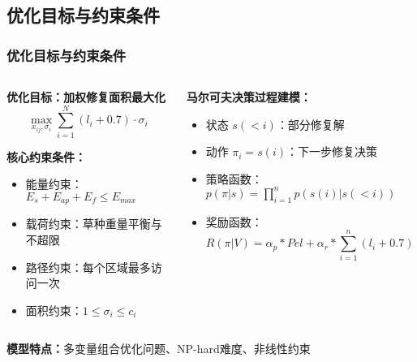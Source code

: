 \documentclass[10pt, aspectratio=169]{beamer}  %
\begin{document}
\subsection{优化目标与约束条件}
\begin{frame}
	\frametitle{优化目标与约束条件}
	\begin{columns}
		\begin{column}{0.5\textwidth}
			\textbf{优化目标：加权修复面积最大化}
			\begin{equation*}
				\max_{x_{ij}, \sigma_i} \sum_{i=1}^{N} (l_i + 0.7) \cdot \sigma_i
			\end{equation*}

			\textbf{核心约束条件：}
			\begin{itemize}
				\item 能量约束：$E_s + E_{ap} + E_f \leq E_{max}$
				\item 载荷约束：草种重量平衡与不超限
				\item 路径约束：每个区域最多访问一次
				\item 面积约束：$1 \leq \sigma_i \leq c_i$
			\end{itemize}
		\end{column}
		\begin{column}{0.5\textwidth}
			\textbf{马尔可夫决策过程建模：}
			\begin{itemize}
				\item 状态 $s(<i)$：部分修复解
				\item 动作 $\pi_i=s(i)$：下一步修复决策
				\item 策略函数：$p(\pi|s)=\prod_{i=1}^n p(s(i)|s(<i))$
				\item 奖励函数：
				      \begin{equation*}
					      R(\pi|V)=\alpha_{p}*Pel+\alpha_{r}*\sum_{i=1}^{n}(l_i+0.7)*a_{i}
				      \end{equation*}
			\end{itemize}
		\end{column}
	\end{columns}
	\vspace{0.3cm}
	\textbf{模型特点：}多变量组合优化问题、NP-hard难度、非线性约束
\end{frame}
\end{document}

